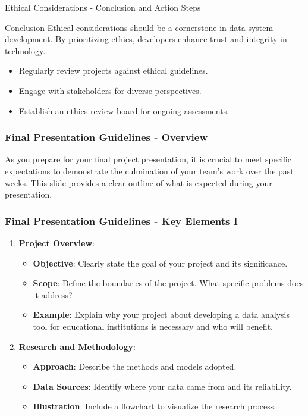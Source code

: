 \documentclass[aspectratio=169]{beamer}
\begin{document}
\begin{frame}[fragile]{Ethical Considerations - Conclusion and Action Steps}
  \begin{block}{Conclusion}
    Ethical considerations should be a cornerstone in data system development. By prioritizing ethics, developers enhance trust and integrity in technology.
  \end{block}
  
  \begin{itemize}
    \item Regularly review projects against ethical guidelines.
    \item Engage with stakeholders for diverse perspectives.
    \item Establish an ethics review board for ongoing assessments.
  \end{itemize}
\end{frame}

\begin{frame}[fragile]
    \frametitle{Final Presentation Guidelines - Overview}
    As you prepare for your final project presentation, it is crucial to meet specific expectations to demonstrate the culmination of your team’s work over the past weeks. This slide provides a clear outline of what is expected during your presentation.
\end{frame}

\begin{frame}[fragile]
    \frametitle{Final Presentation Guidelines - Key Elements I}
    \begin{enumerate}
        \item \textbf{Project Overview}:
            \begin{itemize}
                \item \textbf{Objective}: Clearly state the goal of your project and its significance.
                \item \textbf{Scope}: Define the boundaries of the project. What specific problems does it address?
                \item \textbf{Example}: Explain why your project about developing a data analysis tool for educational institutions is necessary and who will benefit.
            \end{itemize}
        
        \item \textbf{Research and Methodology}:
            \begin{itemize}
                \item \textbf{Approach}: Describe the methods and models adopted.
                \item \textbf{Data Sources}: Identify where your data came from and its reliability.
                \item \textbf{Illustration}: Include a flowchart to visualize the research process.
            \end{itemize}
    \end{enumerate}
\end{frame}
\end{document}
